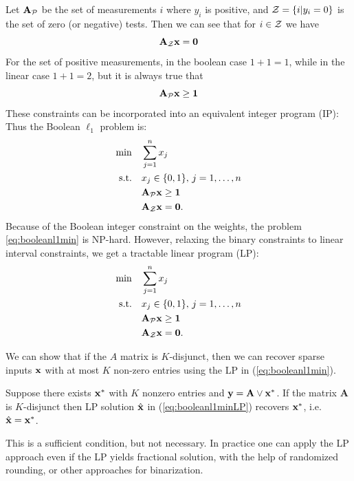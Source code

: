 Let $\mathbf{A}_{\mathcal{P}}$ be the set of measurements $i$ where $y_i$ is positive, 
and $\mathcal{Z} = \{i | y_i = 0\}$ is the set of zero (or negative) tests. Then we can 
see that for $i \in \mathcal{Z}$ we have
\begin{equation}
\mathbf{A}_{\mathcal{Z}}\mathbf{x} = \mathbf{0}
\end{equation}
For the set of positive measurements, in the boolean case $1+1 = 1$, while
in the linear case $1 + 1 = 2$, but it is always true that 
\begin{equation}
\mathbf{A}_{\mathcal{P}}\mathbf{x} \ge \mathbf{1}
\end{equation}
These constraints can be incorporated into an equivalent integer program (IP):
Thus the Boolean $\ell_1$ problem is:
\begin{align}
\label{eq:booleanl1min}
	\min\quad &\sum_{j=1}^{n} x_j \\
	\textrm{s.t.\quad} & x_j \in \{0,1\},\,j = 1,\ldots,n\nonumber\\
		& \mathbf{A}_{\mathcal{P}}\mathbf{x} \ge \mathbf{1}\nonumber\\
		& \mathbf{A}_{\mathcal{Z}}\mathbf{x} = \mathbf{0}.\nonumber
\end{align}
Because of the Boolean integer constraint on the weights, the problem
\eqref{eq:booleanl1min} is NP-hard. However, relaxing the binary constraints
to linear interval constraints, we get a tractable linear program (LP):
\begin{align}
\label{eq:booleanl1min}
	\min\quad &\sum_{j=1}^{n} x_j \\
	\textrm{s.t.\quad} & x_j \in \{0,1\},\,j = 1,\ldots,n\nonumber\\
		& \mathbf{A}_{\mathcal{P}}\mathbf{x} \ge \mathbf{1}\nonumber\\
		& \mathbf{A}_{\mathcal{Z}}\mathbf{x} = \mathbf{0}.\nonumber
\end{align}

We can show that if the $A$ matrix is $K$-disjunct, then we can recover 
sparse inputs $\mathbf{x}$ with at most $K$ non-zero entries using the LP 
in (\ref{eq:booleanl1min}). 
\begin{theorem}
\label{thm:LP_recovery}
Suppose there exists $\mathbf{x}^*$ with $K$ nonzero entries and 
$\mathbf{y} = \mathbf{A} \lor \mathbf{x}^*$. If the matrix $\mathbf{A}$ is $K$-disjunct then 
LP solution $\hat{\mathbf{x}}$ in (\ref{eq:booleanl1minLP}) recovers $\mathbf{x}^*$, i.e. $\hat{\mathbf{x}} = \mathbf{x}^*$.
\end{theorem}

This is a sufficient condition, but not necessary. In practice one can apply
the LP approach even if the LP yields fractional solution, with the help 
of randomized rounding, or other approaches for binarization.

